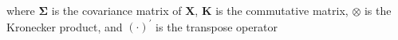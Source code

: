 \noindent where
$\boldsymbol{\Sigma}$ is the covariance matrix of $\mathbf{X}$,
$\mathbf{K}$ is the commutative matrix,
$\otimes$ is the Kronecker product,
and
$\left( \cdot \right)^{\prime}$
is the transpose operator

